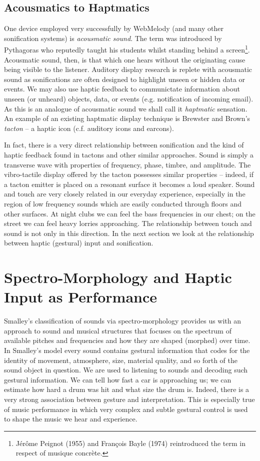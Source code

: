 \documentclass[runningheads]{llncs}
\begin{document}
\subsection{Acousmatics to Haptmatics}
One device employed very successfully by {\sc WebMelody} (and many other sonification systems) is \emph {acousmatic sound}. The term was introduced by Pythagoras who reputedly taught his students whilst standing behind a screen\footnote{Jérôme Peignot (1955) and François Bayle (1974) reintroduced the term in respect of musique concrète.}. Acousmatic sound, then, is that which one hears without the originating cause being visible to the listener. Auditory display research is replete with acousmatic sound as sonifications are often designed to highlight unseen or hidden data or events. We may also use haptic feedback to communictate information about unseen (or unheard) objects, data, or events (e.g. notification of incoming email). As this is an analogue of acousmatic sound we shall call it \emph{haptmatic} sensation. An example of an existing haptmatic display technique is Brewster and Brown's \cite{Brewster:2004} \emph{tacton} -- a haptic icon (c.f. auditory icons and earcons).

In fact, there is a very direct relationship between sonification and the kind of haptic feedback found in tactons and other similar approaches. Sound is simply a transverse wave with properties of frequency, phase, timbre, and amplitude. The vibro-tactile display offered by the tacton possesses similar properties -- indeed, if a tacton emitter is placed on a resonant surface it becomes a loud speaker. Sound and touch are very closely related in our everyday experience, especially in the region of low frequency sounds which are easily conducted through floors and other surfaces. At night clubs we can feel the bass frequencies in our chest; on the street we can feel heavy lorries approaching. The relationship between touch and sound is not only in this direction. In the next section we look at the relationship between haptic (gestural) input and sonification.
\section{Spectro-Morphology and Haptic Input as Performance}
Smalley's \cite{Smalley:1986} classification of sounds via spectro-morphology  provides us with an approach to sound and musical structures that focuses on the spectrum of available pitches and frequencies and how they are shaped (morphed) over time. In Smalley's model every sound contains gestural information that codes for the identity of movement, atmosphere, size, material quality, and so forth of the sound object in question. We are used to listening to sounds and decoding such gestural information. We can tell how fast a car is approaching us; we can estimate how hard a drum was hit and what size the drum is. Indeed, there is a very strong association between gesture and interpretation. This is especially true of music performance in which very complex and subtle gestural control is used to shape the music we hear and experience.
\end{document}
